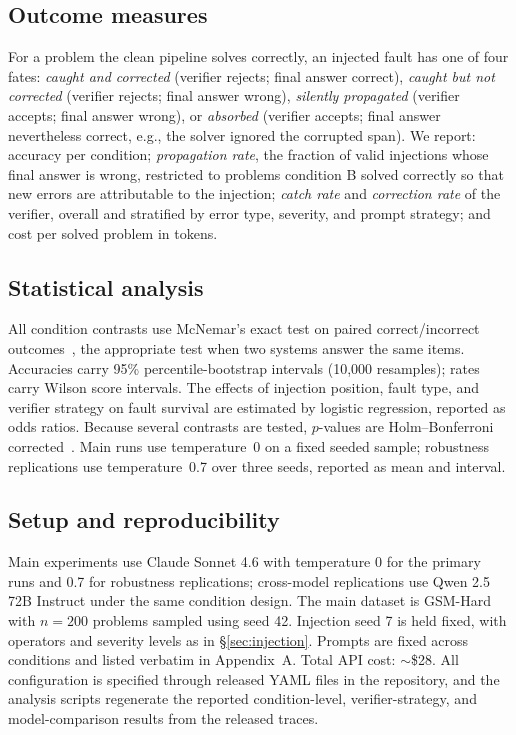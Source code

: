 \documentclass{article}
\begin{document}
\subsection{Outcome measures}
For a problem the clean pipeline solves correctly, an injected fault has one
of four fates: \emph{caught and corrected} (verifier rejects; final answer
correct), \emph{caught but not corrected} (verifier rejects; final answer
wrong), \emph{silently propagated} (verifier accepts; final answer wrong), or
\emph{absorbed} (verifier accepts; final answer nevertheless correct, e.g.,
the solver ignored the corrupted span). We report: accuracy per condition;
\emph{propagation rate}, the fraction of valid injections whose final answer
is wrong, restricted to problems condition B solved correctly so that new
errors are attributable to the injection; \emph{catch rate} and
\emph{correction rate} of the verifier, overall and stratified by error type,
severity, and prompt strategy; and cost per solved problem in tokens.

\subsection{Statistical analysis}
All condition contrasts use McNemar's exact test on paired
correct/incorrect outcomes~\citep{dietterich1998approximate}, the appropriate
test when two systems answer the same items. Accuracies carry 95\%
percentile-bootstrap intervals (10{,}000 resamples); rates carry Wilson
score intervals. The effects of injection position, fault type, and verifier
strategy on fault survival are estimated by logistic regression, reported as
odds ratios. Because several contrasts are tested, $p$-values are
Holm--Bonferroni corrected~\citep{dror2018hitchhiker}. Main runs use
temperature~0 on a fixed seeded sample; robustness replications use
temperature~0.7 over three seeds, reported as mean and interval.

\subsection{Setup and reproducibility}
Main experiments use Claude Sonnet 4.6 with temperature 0 for the primary
runs and 0.7 for robustness replications; cross-model replications use Qwen
2.5 72B Instruct under the same condition design. The main dataset is
GSM-Hard with $n=200$ problems sampled using seed 42. Injection seed 7 is
held fixed, with operators and severity levels as in
\S\ref{sec:injection}. Prompts are fixed across conditions and listed
verbatim in Appendix~A. Total API cost: $\sim$\$28. All configuration is specified through released YAML
files in the repository, and the analysis scripts regenerate the reported
condition-level, verifier-strategy, and model-comparison results from the
released traces.
\end{document}
